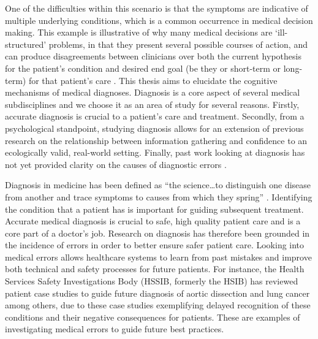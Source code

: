 \documentclass[a4paper, nobind]{templates/ociamthesis}
\begin{document}
One of the difficulties within this scenario is that the symptoms are indicative of multiple underlying conditions, which is a common occurrence in medical decision making. This example is illustrative of why many medical decisions are `ill-structured' problems, in that they present several possible courses of action, and can produce disagreements between clinicians over both the current hypothesis for the patient's condition and desired end goal (be they or short-term or long-term) for that patient's care \autocite{jonassen_instructional_1997}. This thesis aims to elucidate the cognitive mechanisms of medical diagnoses. Diagnosis is a core aspect of several medical subdisciplines and we choose it as an area of study for several reasons. Firstly, accurate diagnosis is crucial to a patient's care and treatment. Secondly, from a psychological standpoint, studying diagnosis allows for an extension of previous research on the relationship between information gathering and confidence to an ecologically valid, real-world setting. Finally, past work looking at diagnosis has not yet provided clarity on the causes of diagnostic errors \autocite{van_den_berge_cognitive_2013,norman_etiology_2014,restrepo_annals_2020}.

\hfill\break
Diagnosis in medicine has been defined as ``the science\ldots to distinguish one disease from another and trace symptoms to causes from which they spring'' \autocite{fenwick_medical_1891}. Identifying the condition that a patient has is important for guiding subsequent treatment. Accurate medical diagnosis is crucial to safe, high quality patient care and is a core part of a doctor's job. Research on diagnosis has therefore been grounded in the incidence of errors in order to better ensure safer patient care. Looking into medical errors allows healthcare systems to learn from past mistakes and improve both technical and safety processes for future patients. For instance, the Health Services Safety Investigations Body (HSSIB, formerly the HSIB) has reviewed patient case studies to guide future diagnosis of aortic dissection \autocite{hsib_investigation_2021} and lung cancer \autocite{hsib_investigation_2022} among others, due to these case studies exemplifying delayed recognition of these conditions and their negative consequences for patients. These are examples of investigating medical errors to guide future best practices.
\end{document}
